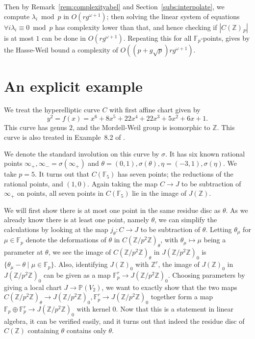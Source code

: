\documentclass[12pt]{article}
\newcommand{\Z}{\mathbb{Z}}
\renewcommand{\P}{\mathbb{P}}
\newcommand{\F}{\mathbb{F}}
\theoremstyle{plain}
\theoremstyle{definition}
\theoremstyle{remark}
\begin{document}
Then by Remark~\ref{rem:complexityabel} and Section~\ref{subs:interpolate}, we compute $\lambda_i \bmod p$ in $O(rg^{\omega+1})$; then solving the linear system of equations $\forall i \lambda_i \equiv 0 \bmod p$ has complexity lower than that, and hence checking if $|C(\Z)_P|$ is at most $1$ can be done in $O(rg^{\omega+1})$. Repeating this for all $\F_p$-points, gives by the Hasse-Weil bound a complexity of $O\left((p + g\sqrt{p})rg^{\omega+1}\right)$.

\section{An explicit example}
\label{section:example}
We treat the hyperelliptic curve $C$ with first affine chart given by
\[
y^2 = f(x) = x^6+ 8x^5+ 22x^4+ 22x^3+ 5x^2+ 6x+ 1.
\]
This curve has genus $2$, and the Mordell-Weil group is isomorphic to $\Z$. This curve is also treated in Example~8.2 of \citep{poonen12}.

We denote the standard involution on this curve by $\sigma$. It has six known rational points $\infty_+,\infty_- = \sigma(\infty_+)$ and $\theta = (0,1),\sigma(\theta),\eta=(-3,1),\sigma(\eta)$. We take $p = 5$. It turns out that $C(\F_5)$ has seven points; the reductions of the rational points, and $(1,0)$. Again taking the map $C \to J$ to be subtraction of $\infty_+$ on points, all seven points in $C(\F_5)$ lie in the image of $J(\Z)$.

We will first show there is at most one point in the same residue disc as $\theta$. As we already know there is at least one point, namely $\theta$, we can simplify the calculations by looking at the map $j_{\theta}: C \to J$ to be subtraction of $\theta$. Letting $\theta_{\mu}$ for $\mu \in \F_p$ denote the deformations of $\theta$ in $C(\Z/p^2\Z)_{\theta}$, with $\theta_\mu \mapsto \mu$ being a parameter at $\theta$, we see the image of $C(\Z/p^2\Z)_\theta$ in $J(\Z/p^2\Z)_0$ is $\{\theta_\mu - \theta \mid \mu \in \F_p\}$. Also, identifying $J(\Z)_0$ with $\Z^r$, the image of $J(\Z)_0$ in $J(\Z/p^2\Z)_0$ can be given as a map $\F_p^r \to J(\Z/p^2\Z)_0$. Choosing parameters by giving a local chart $J \to \P(V_2)$, we want to exactly show that the two maps $C(\Z/p^2\Z)_\theta \to J(\Z/p^2\Z)_0, \F_p^r \to J(\Z/p^2\Z)_0$ together form a map $\F_p \oplus \F_p^r \to J(\Z/p^2\Z)_0$ with kernel $0$. Now that this is a statement in linear algebra, it can be verified easily, and it turns out that indeed the residue disc of $C(\Z)$ containing $\theta$ contains only $\theta$.
\end{document}

